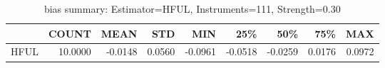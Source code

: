 \begin{table}[ht]
\centering
\caption{bias summary: Estimator=HFUL, Instruments=111, Strength=0.30}
\begin{tabular}{lrrrrrrrr}
\toprule
 & COUNT & MEAN & STD & MIN & 25\% & 50\% & 75\% & MAX \\
\midrule
HFUL & 10.0000 & -0.0148 & 0.0560 & -0.0961 & -0.0518 & -0.0259 & 0.0176 & 0.0972 \\
\bottomrule
\end{tabular}
\end{table}

